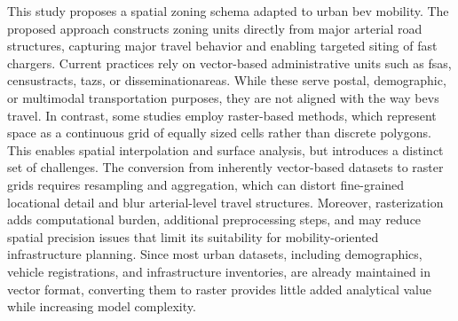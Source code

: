 This study proposes a spatial zoning schema adapted to urban \gls{bev} mobility.
The proposed approach constructs zoning units directly from major arterial road structures, capturing major travel behavior and enabling targeted siting of fast chargers. 
Current practices rely on vector-based administrative units such as \glspl{fsa}, \glspl{censustract}, \glspl{taz}, or \glspl{disseminationarea}. While these serve postal, demographic, or multimodal transportation purposes, they are not aligned with the way \gls{bev}s travel. In contrast, some studies employ raster-based methods, which represent space as a continuous grid of equally sized cells rather than discrete polygons. This enables spatial interpolation and surface analysis, but introduces a distinct set of challenges. The conversion from inherently vector-based datasets to raster grids requires resampling and aggregation, which can distort fine-grained locational detail and blur arterial-level travel structures. Moreover, rasterization adds computational burden, additional preprocessing steps, and may reduce spatial precision issues that limit its suitability for mobility-oriented infrastructure planning. Since most urban datasets, including demographics, vehicle registrations, and infrastructure inventories, are already maintained in vector format, converting them to raster provides little added analytical value while increasing model complexity.




